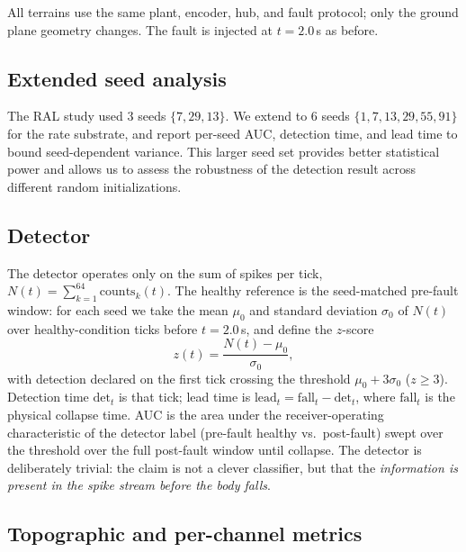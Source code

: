 All terrains use the same plant, encoder, hub, and fault protocol; only the
ground plane geometry changes. The fault is injected at $t = 2.0$\,s as
before.

\subsection{Extended seed analysis}

The RAL study used 3 seeds $\{7, 29, 13\}$. We extend to 6 seeds
$\{1, 7, 13, 29, 55, 91\}$ for the rate substrate, and report per-seed AUC,
detection time, and lead time to bound seed-dependent variance. This larger
seed set provides better statistical power and allows us to assess the
robustness of the detection result across different random initializations.

\subsection{Detector}

The detector operates only on the sum of spikes per tick,
$N(t) = \sum_{k=1}^{64} \mathrm{counts}_k(t)$. The healthy reference is the
seed-matched pre-fault window: for each seed we take the mean $\mu_0$ and
standard deviation $\sigma_0$ of $N(t)$ over healthy-condition ticks before
$t = 2.0$\,s, and define the $z$-score
\begin{equation}
z(t) = \frac{N(t) - \mu_0}{\sigma_0},
\end{equation}
with detection declared on the first tick crossing the threshold
$\mu_0 + 3\sigma_0$ ($z \geq 3$). Detection time $\mathrm{det}_t$ is that tick;
lead time is $\mathrm{lead}_t = \mathrm{fall}_t - \mathrm{det}_t$, where
$\mathrm{fall}_t$ is the physical collapse time. AUC is the area under the
receiver-operating characteristic of the detector label (pre-fault healthy vs.\
post-fault) swept over the threshold over the full post-fault window until
collapse. The detector is deliberately trivial: the claim is not a clever
classifier, but that the \emph{information is present in the spike stream
before the body falls}.

\subsection{Topographic and per-channel metrics}

